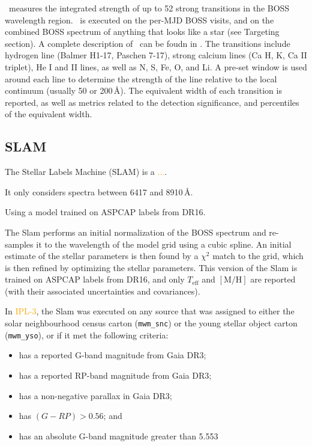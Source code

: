 \documentclass[modern]{aastex631}
\newcommand{\todo}[1]{\textcolor{orange}{#1}}
\newcommand{\teff}{T_\mathrm{eff}}
\newcommand{\mh}{[\mathrm{M/H}]}
\begin{document}
\LineForest\ measures the integrated strength of up to 52 strong transitions in the BOSS wavelength region. \LineForest\ is executed on the per-MJD BOSS visits, and on the combined BOSS spectrum of anything that looks like a star (see Targeting section). A complete description of \LineForest\ can be foudn in \citet{somewhere}. The transitions include hydrogen line (Balmer H1-17, Paschen 7-17), strong calcium lines (Ca H, K, Ca II triplet), He I and II lines, as well as N, S, Fe, O, and Li. A pre-set window is used around each line to determine the strength of the line relative to the local continuum (usually 50 or 200\,\AA). The equivalent width of each transition is reported, as well as metrics related to the detection significance, and percentiles of the equivalent width. 


\subsection{SLAM} \label{sec:methods-slam}

The Stellar Labels Machine (SLAM) is a \todo{...}.

It only considers spectra between 6417 and 8910\,\AA. 

Using a model trained on ASPCAP labels from DR16.

The Slam performs an initial normalization of the BOSS spectrum and re-samples it to the wavelength of the model grid using a cubic spline. An initial estimate of the stellar parameters is then found by a $\chi^2$ match to the grid, which is then refined by optimizing the stellar parameters. This version of the Slam is trained on ASPCAP labels from DR16, and only $\teff$ and $\mh$ are reported (with their associated uncertainties and covariances).


In \todo{IPL-3}, the Slam was executed on any source that was assigned to either the solar neighbourhood census carton (\texttt{mwm\_snc}) or the young stellar object carton (\texttt{mwm\_yso}), or if it met the following criteria:
\begin{itemize}
	\item has a reported G-band magnitude from Gaia DR3;
	\item has a reported RP-band magnitude from Gaia DR3;
	\item has a non-negative parallax in Gaia DR3;
	\item has $(G - RP) > 0.56$; and
	\item has an absolute G-band magnitude greater than 5.553
\end{itemize}
\end{document}
